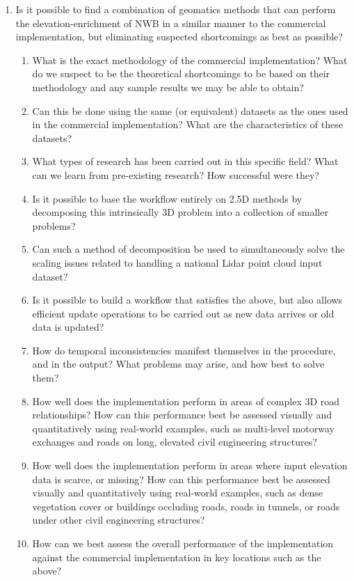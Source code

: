 \begin{enumerate}
    \item Is it possible to find a combination of geomatics methods that can perform the elevation-enrichment of NWB in a similar manner to the commercial implementation, but eliminating suspected shortcomings as best as possible?
    \begin{enumerate}
        \item What is the exact methodology of the commercial implementation? What do we suspect to be the theoretical shortcomings to be based on their methodology and any sample results we may be able to obtain?
        \item Can this be done using the same (or equivalent) datasets as the ones used in the commercial implementation? What are the characteristics of these datasets?
        \item What types of research has been carried out in this specific field? What can we learn from pre-existing research? How successful were they?
        \item Is it possible to base the workflow entirely on 2.5D methods by decomposing this intrinsically 3D problem into a collection of smaller problems?
        \item Can such a method of decomposition be used to simultaneously solve the scaling issues related to handling a national Lidar point cloud input dataset?
        \item Is it possible to build a workflow that satisfies the above, but also allows efficient update operations to be carried out as new data arrives or old data is updated?
        \item How do temporal inconsistencies manifest themselves in the procedure, and in the output? What problems may arise, and how best to solve them?
        \item How well does the implementation perform in areas of complex 3D road relationships? How can this performance best be assessed visually and quantitatively using real-world examples, such as multi-level motorway exchanges and roads on long, elevated civil engineering structures?
        \item How well does the implementation perform in areas where input elevation data is scarce, or missing? How can this performance best be assessed visually and quantitatively using real-world examples, such as dense vegetation cover or buildings occluding roads, roads in tunnels, or roads under other civil engineering structures?
        \item How can we best assess the overall performance of the implementation against the commercial implementation in key locations such as the above?

\end{enumerate}
\end{enumerate}
